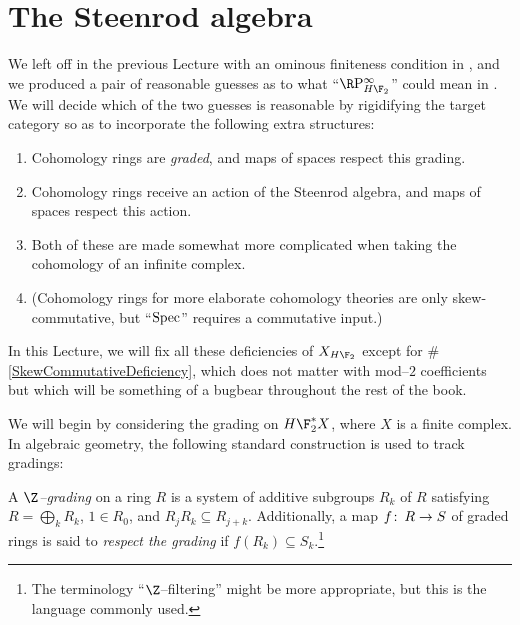 \section{The Steenrod algebra}\label{TheSteenrodAlgebraSection}

We left off in the previous Lecture with an ominous finiteness condition in , and we produced a pair of reasonable guesses as to what ``$\RP^\infty_{H\F_2}$'' could mean in .  We will decide which of the two guesses is reasonable by rigidifying the target category so as to incorporate the following extra structures:
\begin{enumerate}
\item Cohomology rings are \emph{graded}, and maps of spaces respect this grading.
\item Cohomology rings receive an action of the Steenrod algebra, and maps of spaces respect this action.
\item Both of these are made somewhat more complicated when taking the cohomology of an infinite complex.
\item \label{SkewCommutativeDeficiency} (Cohomology rings for more elaborate cohomology theories are only skew-commutative, but ``$\operatorname{Spec}$'' requires a commutative input.)
\end{enumerate}
In this Lecture, we will fix all these deficiencies of $X_{H\F_2}$ except for \#\ref{SkewCommutativeDeficiency}, which does not matter with mod--$2$ coefficients but which will be something of a bugbear throughout the rest of the book.

We will begin by considering the grading on $H\F_2^* X$, where $X$ is a finite complex.  In algebraic geometry, the following standard construction is used to track gradings:

\begin{definition}
A \textit{$\Z$--grading} on a ring $R$ is a system of additive subgroups $R_k$ of $R$ satisfying $R = \bigoplus_k R_k$, $1 \in R_0$, and $R_j R_k \subseteq R_{j+k}$.  Additionally, a map $f\colon\thinspace R \to S$ of graded rings is said to \textit{respect the grading} if $f(R_k) \subseteq S_k$.\footnote{The terminology ``$\Z$--filtering'' might be more appropriate, but this is the language commonly used.}
\end{definition}

